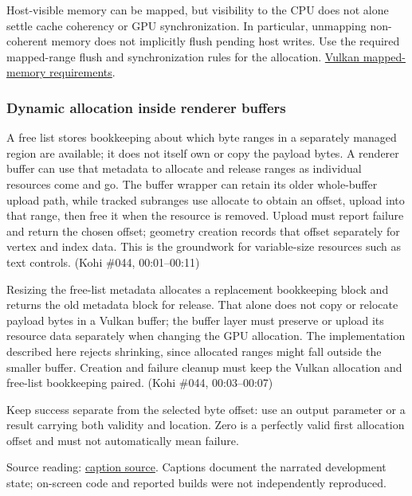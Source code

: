 Host-visible memory can be mapped, but visibility to the CPU does not alone settle cache coherency or GPU synchronization. In particular, unmapping non-coherent memory does not implicitly flush pending host writes. Use the required mapped-range flush and synchronization rules for the allocation. \href{https://docs.vulkan.org/refpages/latest/refpages/source/vkFlushMappedMemoryRanges.html}{Vulkan mapped-memory requirements}.

\subsubsection{Dynamic allocation inside renderer buffers}\label{06-engine-ii-ch025-dynamic-allocation-inside-renderer-buffers}

\hypertarget{06-engine-ii-ch025-dynamic-allocation-inside-renderer-buffers}{}

A free list stores bookkeeping about which byte ranges in a separately managed region are available; it does not itself own or copy the payload bytes. A renderer buffer can use that metadata to allocate and release ranges as individual resources come and go. The buffer wrapper can retain its older whole-buffer upload path, while tracked subranges use allocate to obtain an offset, upload into that range, then free it when the resource is removed. Upload must report failure and return the chosen offset; geometry creation records that offset separately for vertex and index data. This is the groundwork for variable-size resources such as text controls. (Kohi \#044, 00:01--00:11)

Resizing the free-list metadata allocates a replacement bookkeeping block and returns the old metadata block for release. That alone does not copy or relocate payload bytes in a Vulkan buffer; the buffer layer must preserve or upload its resource data separately when changing the GPU allocation. The implementation described here rejects shrinking, since allocated ranges might fall outside the smaller buffer. Creation and failure cleanup must keep the Vulkan allocation and free-list bookkeeping paired. (Kohi \#044, 00:03--00:07)

Keep success separate from the selected byte offset: use an output parameter or a result carrying both validity and location. Zero is a perfectly valid first allocation offset and must not automatically mean failure.

Source reading: \href{https://www.youtube.com/watch?v=SNDJ-rGJd5A}{caption source}. Captions document the narrated development state; on-screen code and reported builds were not independently reproduced.

